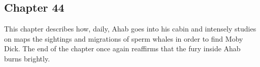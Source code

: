 \subsection{Chapter 44}

This chapter describes how, daily, Ahab goes into his cabin and intensely
studies on maps the sightings and migrations of sperm whales in order to find
Moby Dick. The end of the chapter once again reaffirms that the fury inside
Ahab burns brightly.
